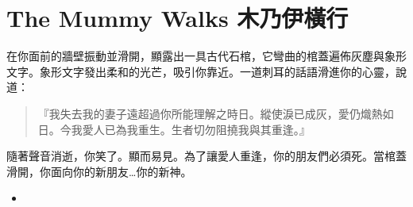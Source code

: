 
\chapter{The Mummy Walks 木乃伊橫行}

\begin{HauntStory}
  在你面前的牆壁振動並滑開，顯露出一具古代石棺，它彎曲的棺蓋遍佈灰塵與象形文字。象形文字發出柔和的光芒，吸引你靠近。一道刺耳的話語滑進你的心靈，說道：

  \begin{quote}
    『我失去我的妻子遠超過你所能理解之時日。縱使淚已成灰，愛仍熾熱如日。今我愛人已為我重生。生者切勿阻撓我與其重逢。』
  \end{quote}

  隨著聲音消逝，你笑了。顯而易見。為了讓愛人重逢，你的朋友們必須死。當棺蓋滑開，你面向你的新朋友…你的新神。
\end{HauntStory}

\vspace*{-1em}
\begin{itemize}
  \item
\end{itemize}
